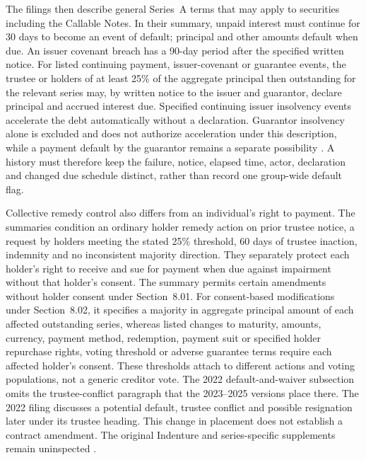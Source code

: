 \newpage
The filings then describe general Series~A terms that may apply to securities
including the Callable Notes. In their summary, unpaid interest must continue
for 30 days to become an event of default; principal and other amounts default
when due. An issuer covenant breach has a 90-day period after the specified
written notice. For listed continuing payment, issuer-covenant or guarantee
events, the trustee or holders of at least 25\% of the aggregate principal
then outstanding for the relevant series may, by written notice to the issuer
and guarantor, declare principal and accrued interest due. Specified continuing
issuer insolvency events accelerate the debt automatically without a declaration. Guarantor insolvency
alone is excluded and does not authorize acceleration under this description,
while a payment default by the guarantor remains a separate possibility
\citep{jpmorgan2022tenk,jpmorgan2023tenk,jpmorgan2024tenk,jpmorgan2025tenk}.
A history must therefore keep the failure, notice, elapsed time, actor,
declaration and changed due schedule distinct, rather than record one
group-wide default flag.

Collective remedy control also differs from an individual's right to payment.
The summaries condition an ordinary holder remedy action on prior trustee
notice, a request by holders meeting the stated 25\% threshold, 60 days of
trustee inaction, indemnity and no inconsistent majority direction. They
separately protect each holder's right to receive and sue for payment when due
against impairment without that holder's consent. The summary permits certain
amendments without holder consent under Section~8.01. For consent-based
modifications under Section~8.02, it specifies a majority in aggregate
principal amount of each affected outstanding series, whereas
listed changes to maturity, amounts, currency, payment method, redemption,
payment suit or specified holder repurchase rights, voting threshold or adverse guarantee terms require each
affected holder's consent. These thresholds attach to different actions and
voting populations, not a generic creditor vote. The 2022 default-and-waiver
subsection omits the trustee-conflict paragraph that the 2023--2025 versions
place there. The 2022 filing discusses a potential default, trustee conflict
and possible resignation later under its trustee heading. This change in
placement does not establish a contract amendment. The original Indenture and
series-specific supplements remain uninspected
\citep{jpmorgan2022tenk,jpmorgan2023tenk,jpmorgan2024tenk,jpmorgan2025tenk}.

